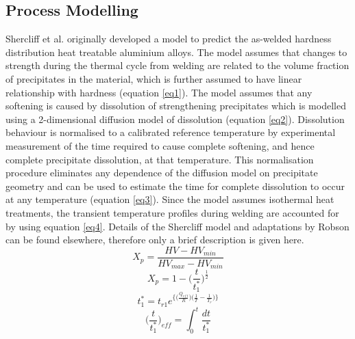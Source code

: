 	\subsection{Process Modelling}
	\label{ModellingProcess}
	Shercliff et al. \cite{Shercliff1990,Shercliff1990a} originally developed a model to predict the as-welded hardness distribution heat treatable aluminium alloys. The model assumes that changes to strength during the thermal cycle from welding are related to the volume fraction of precipitates in the material, which is further assumed to have linear relationship with hardness (equation \ref{eq1}). The model assumes that any softening is caused by dissolution of strengthening precipitates which is modelled using a 2-dimensional diffusion model of dissolution (equation \ref{eq2}). Dissolution behaviour is normalised to a calibrated reference temperature by experimental measurement of the time required to cause complete softening, and hence complete precipitate dissolution, at that temperature. This normalisation procedure eliminates any dependence of the diffusion model on precipitate geometry and can be used to estimate the time for complete dissolution to occur at any temperature (equation \ref{eq3}). Since the model assumes isothermal heat treatments, the transient temperature profiles during welding are accounted for by using equation \ref{eq4}. Details of the Shercliff model \cite{Shercliff1990,Shercliff1990a} and adaptations by Robson \cite{Robson2006a} can be found elsewhere, therefore only a brief description is given here.
	\begin{equation}
	\label{eq1}
	X_p = \frac{HV-HV_{min}}{HV_{max}-HV_{min}}
	\end{equation}
	\begin{equation}
	\label{eq2}
	X_p =1-\bigg(\frac{t}{t_1^{*}}\bigg)^{\frac{1}{2}}
	\end{equation}
	\begin{equation}
	\label{eq3}
	t_1^{*} =t_{r1}e^{\bigg\{\bigg(\frac{Q_{eff}}{R}\bigg)\bigg(\frac{1}{T}-\frac{1}{T_r}\bigg)\bigg\}}
	\end{equation}
	\begin{equation}
	\label{eq4}
	\bigg(\frac{t}{t_1^{*}}\bigg)_{eff} =\int_{0}^{t}\frac{dt}{t_1^{\text{*}}}
	\end{equation}
